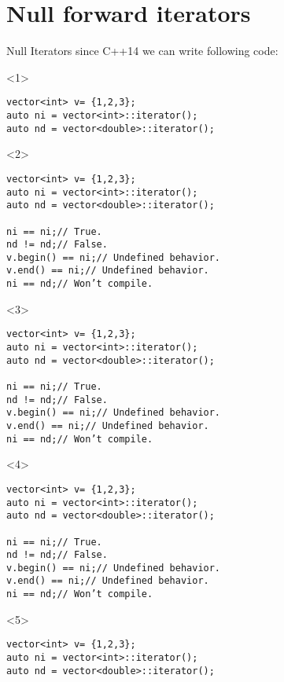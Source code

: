 \documentclass[10pt]{beamer}
\begin{document}
\section{Null forward iterators}
\begin{frame}[fragile]{Null Iterators}
\centering since C++14 we can write following code:
\vfill
\begin{onlyenv}<1>
  \begin{verbatim}
vector<int> v= {1,2,3};
auto ni = vector<int>::iterator();
auto nd = vector<double>::iterator();
  \end{verbatim}
\end{onlyenv}

\begin{onlyenv}<2>
  \begin{verbatim}
vector<int> v= {1,2,3};
auto ni = vector<int>::iterator();
auto nd = vector<double>::iterator();

ni == ni;// True.
nd != nd;// False.
v.begin() == ni;// Undefined behavior.
v.end() == ni;// Undefined behavior. 
ni == nd;// Won’t compile.  
  \end{verbatim}
\end{onlyenv}

\begin{onlyenv}<3>
  \begin{verbatim}
vector<int> v= {1,2,3};
auto ni = vector<int>::iterator();
auto nd = vector<double>::iterator();

ni == ni;// True.
nd != nd;// False.
v.begin() == ni;// Undefined behavior.
v.end() == ni;// Undefined behavior. 
ni == nd;// Won’t compile.  
  \end{verbatim}
\end{onlyenv}

\begin{onlyenv}<4>
  \begin{verbatim}
vector<int> v= {1,2,3};
auto ni = vector<int>::iterator();
auto nd = vector<double>::iterator();

ni == ni;// True.
nd != nd;// False.
v.begin() == ni;// Undefined behavior.
v.end() == ni;// Undefined behavior. 
ni == nd;// Won’t compile.  
  \end{verbatim}
\end{onlyenv}

\begin{onlyenv}<5>
  \begin{verbatim}
vector<int> v= {1,2,3};
auto ni = vector<int>::iterator();
auto nd = vector<double>::iterator();


\end{verbatim}
\end{onlyenv}
\end{frame}
\end{document}
